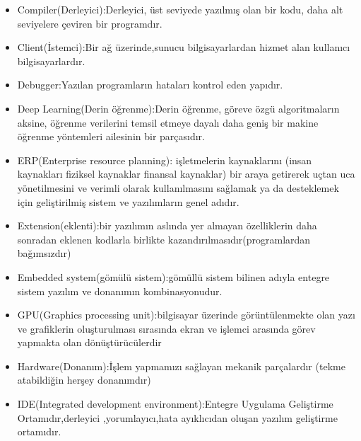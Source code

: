 \documentclass[10pt,a4paper,twoside]{article}
\begin{document}
\begin{itemize}
  \item Compiler(Derleyici):Derleyici, üst seviyede yazılmış olan bir kodu, daha alt seviyelere çeviren bir programdır.
  \item Client(İstemci):Bir ağ üzerinde,sunucu bilgisayarlardan hizmet alan kullanıcı bilgisayarlardır.
  \item Debugger:Yazılan programların hataları kontrol eden yapıdır.
  \item Deep Learning(Derin öğrenme):Derin öğrenme, göreve özgü algoritmaların aksine, öğrenme verilerini temsil etmeye dayalı daha geniş bir makine öğrenme yöntemleri ailesinin bir parçasıdır.
  \item ERP(Enterprise resource planning): işletmelerin kaynaklarını (insan kaynakları fiziksel kaynaklar finansal kaynaklar) bir araya getirerek uçtan uca yönetilmesini ve verimli olarak kullanılmasını sağlamak ya da desteklemek için geliştirilmiş sistem ve yazılımların genel adıdır. 
  \item Extension(eklenti):bir yazılımın aslında yer almayan özelliklerin daha sonradan eklenen kodlarla birlikte kazandırılmasıdır(programlardan bağımsızdır)
  \item Embedded system(gömülü sistem):gömüllü sistem bilinen adıyla entegre sistem yazılım ve donanımın kombinasyonudur.
  \item GPU(Graphics processing unit):bilgisayar üzerinde görüntülenmekte olan yazı ve grafiklerin oluşturulması sırasında ekran ve işlemci arasında görev yapmakta olan dönüştürücülerdir
  \item Hardware(Donanım):İşlem yapmamızı sağlayan mekanik parçalardır (tekme atabildiğin herşey donanımdır)
  \item IDE(Integrated development environment):Entegre Uygulama Geliştirme Ortamıdır,derleyici ,yorumlayıcı,hata ayıklıcıdan oluşan yazılım geliştirme ortamıdır.


\end{itemize}
\end{document}
